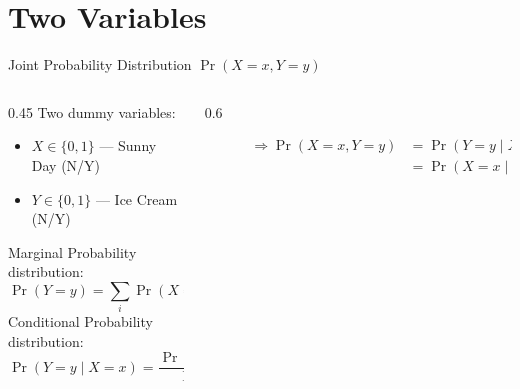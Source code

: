 \documentclass[notes,10pt, aspectratio=169]{beamer}
\begin{document}
\section{Two Variables}

\begin{frame}{Joint Probability Distribution $\Pr(X=x, Y=y)$}
 \begin{columns}
\begin{column}{0.45\textwidth}
Two dummy variables:
    \begin{itemize}
    \item $X \in \{0,1\}$ --- Sunny Day (N/Y)
    \item $Y \in \{0,1\}$ --- Ice Cream (N/Y)
    \end{itemize}
\vspace{.5cm}
Marginal Probability distribution:
\begin{equation*}
    \Pr(Y=y) = \sum_i \Pr(X=x_i, Y=y)
\end{equation*}
Conditional Probability distribution:
\begin{equation*}
    \Pr(Y=y \mid X=x) = \frac{\Pr(X=x, Y=y)}{\Pr(X=x)}
\end{equation*}

\end{column}
\begin{column}{0.6\textwidth}
\vspace{1.2cm}
\begin{figure}
        \begin{table}
        \end{table}
\vspace{1cm}
\begin{eqnarray*}
\Rightarrow \Pr(X=x, Y=y) &= \Pr(Y=y \mid X=x)\Pr(X=x)\\
                             &= \Pr(X=x \mid Y=y)\Pr(Y=y)
\end{eqnarray*}
\end{figure}
\end{column}
\end{columns}
\end{frame}
\end{document}
